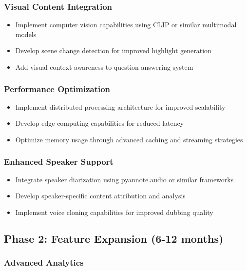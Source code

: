 \documentclass{bscs}
\begin{document}
\subsubsection{Visual Content Integration}

\begin{itemize}
\item Implement computer vision capabilities using CLIP or similar multimodal models
\item Develop scene change detection for improved highlight generation
\item Add visual context awareness to question-answering system
\end{itemize}

\subsubsection{Performance Optimization}

\begin{itemize}
\item Implement distributed processing architecture for improved scalability
\item Develop edge computing capabilities for reduced latency
\item Optimize memory usage through advanced caching and streaming strategies
\end{itemize}

\subsubsection{Enhanced Speaker Support}

\begin{itemize}
\item Integrate speaker diarization using pyannote.audio or similar frameworks
\item Develop speaker-specific content attribution and analysis
\item Implement voice cloning capabilities for improved dubbing quality
\end{itemize}

\subsection{Phase 2: Feature Expansion (6-12 months)}

\subsubsection{Advanced Analytics}
\end{document}
